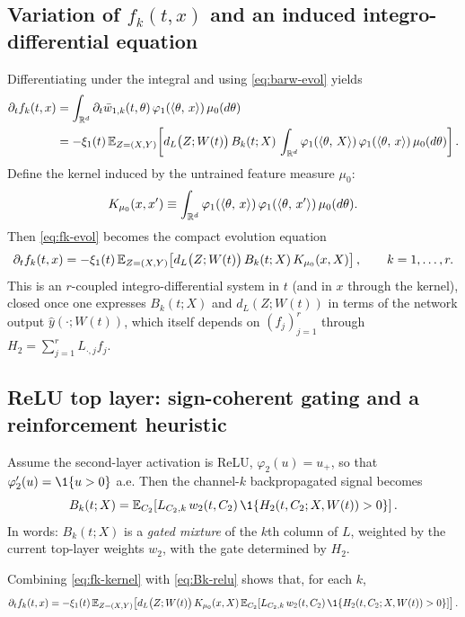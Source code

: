 \subsection{Variation of $f_k(t,x)$ and an induced integro-differential equation}

Differentiating under the integral and using \eqref{eq:barw-evol} yields
\begin{align}
\partial_t f_k(t,x)
&=\int_{\mathbb{R}^d}\partial_t\bar w_{1,k}(t,\theta)\,\varphi_1(\left\langle \theta,\,x \right\rangle)\,\mu_0(d\theta)\nonumber\\
&=-\xi_1(t)\,\mathbb{E}_{Z=(X,Y)}\!\left[d_L\big(Z;W(t)\big)\,B_k(t;X)\,\int_{\mathbb{R}^d}\varphi_1(\left\langle \theta,\,X \right\rangle)\,\varphi_1(\left\langle \theta,\,x \right\rangle)\,\mu_0(d\theta)\right].\label{eq:fk-evol}
\end{align}
Define the kernel induced by the untrained feature measure $\mu_0$:
\[
K_{\mu_0}(x,x')\equiv \int_{\mathbb{R}^d}\varphi_1(\left\langle \theta,\,x \right\rangle)\,\varphi_1(\left\langle \theta,\,x' \right\rangle)\,\mu_0(d\theta).
\]
Then \eqref{eq:fk-evol} becomes the compact evolution equation
\begin{equation}\label{eq:fk-kernel}
\partial_t f_k(t,x)=-\xi_1(t)\,\mathbb{E}_{Z=(X,Y)}\!\left[d_L\big(Z;W(t)\big)\,B_k(t;X)\,K_{\mu_0}(x,X)\right],\qquad k=1,\dots,r.
\end{equation}
This is an $r$-coupled integro-differential system in $t$ (and in $x$ through the kernel), closed once one expresses $B_k(t;X)$ and $d_L(Z;W(t))$ in terms of the network output $\hat y(\cdot;W(t))$, which itself depends on $(f_j)_{j=1}^r$ through $H_2=\sum_{j=1}^r L_{\cdot,j} f_j$.

\subsection{ReLU top layer: sign-coherent gating and a reinforcement heuristic}

Assume the second-layer activation is ReLU, $\varphi_2(u)=u_+$, so that $\varphi_2'(u)=\1\{u>0\}$ a.e.
Then the channel-$k$ backpropagated signal becomes
\begin{equation}\label{eq:Bk-relu}
B_k(t;X)=\E_{C_2}\!\left[L_{C_2,k}\,w_2(t,C_2)\,\1\!\left\{H_2(t,C_2;X,W(t))>0\right\}\right].
\end{equation}
In words: $B_k(t;X)$ is a \emph{gated mixture} of the $k$th column of $L$, weighted by the current top-layer weights $w_2$, with the gate determined by $H_2$.

Combining \eqref{eq:fk-kernel} with \eqref{eq:Bk-relu} shows that, for each $k$,
\[
\partial_t f_k(t,x)=-\xi_1(t)\,\E_{Z=(X,Y)}\!\left[d_L\big(Z;W(t)\big)\,K_{\mu_0}(x,X)\,
\E_{C_2}\!\left[L_{C_2,k}\,w_2(t,C_2)\,\1\!\left\{H_2(t,C_2;X,W(t))>0\right\}\right]\right].
\]

